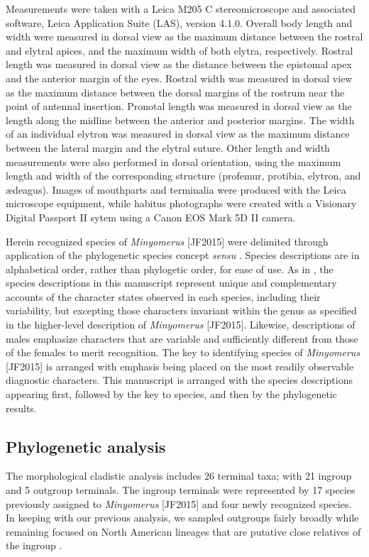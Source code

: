 \documentclass[fleqn,10pt,lineno]{wlpeerj} %
\begin{document}
		Measurements were taken with a Leica M205 C stereomicroscope and associated software, Leica Application Suite (LAS), version 4.1.0.
		Overall body length and width were measured in dorsal view as the maximum distance between the rostral and elytral apices, and the maximum width of both elytra, respectively.
		Rostral length was measured in dorsal view as the distance between the epistomal apex and the anterior margin of the eyes.
		Rostral width was measured in dorsal view as the maximum distance between the dorsal margins of the rostrum near the point of antennal insertion.
		Pronotal length was measured in dorsal view as the length along the midline between the anterior and posterior margins.
		The width of an individual elytron was measured in dorsal view as the maximum distance between the lateral margin and the elytral suture.
		Other length and width measurements were also performed in dorsal orientation, using the maximum length and width of the corresponding structure (profemur, protibia, elytron, and {\ae}deagus).
		Images of mouthparts and terminalia were produced with the Leica microscope equipment, while habitus photographs were created with a Visionary Digital Passport II sytem using a Canon EOS Mark 5D II camera.

		Herein recognized species of \textit{Minyomerus} [JF2015] were delimited through application of the phylogenetic species concept \textit{sensu} \citet{wheeler2000}.
		Species descriptions are in alphabetical order, rather than phylogetic order, for ease of use.
		As in \citet{jansen2015}, the species descriptions in this manuscript represent unique and complementary accounts of the character states observed in each species, including their variability, but excepting those characters invariant within the genus as specified in the higher-level description of \textit{Minyomerus} [JF2015].
		Likewise, descriptions of males emphasize characters that are variable and sufficiently different from those of the females to merit recognition.
		The key to identifying species of \textit{Minyomerus} [JF2015] is arranged with emphasis being placed on the most readily observable diagnostic characters.
				This manuscript is arranged with the species descriptions appearing first, followed by the key to species, and then by the phylogenetic results.
		
	\subsection*{Phylogenetic analysis}\label{ssec:phylo} 
		The morphological cladistic analysis includes 26 terminal taxa; with 21 ingroup and 5 outgroup terminals.
		The ingroup terminals were represented by 17 species previously assigned to \textit{Minyomerus} [JF2015] and four newly recognized species.
		In keeping with our previous analysis, we sampled outgroups fairly broadly while remaining focused on North American lineages that are putative close relatives of the ingroup \citep{jansen2015, nixon1993}.
		
\end{document}
